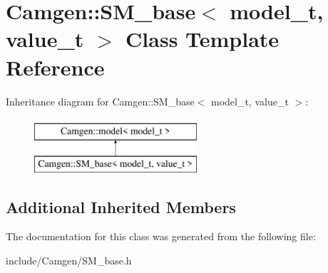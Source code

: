 \hypertarget{a00499}{\section{Camgen\-:\-:S\-M\-\_\-base$<$ model\-\_\-t, value\-\_\-t $>$ Class Template Reference}
\label{a00499}
}
Inheritance diagram for Camgen\-:\-:S\-M\-\_\-base$<$ model\-\_\-t, value\-\_\-t $>$\-:\begin{figure}[H]
\begin{center}
\leavevmode
\includegraphics[height=2.000000cm]{a00499}
\end{center}
\end{figure}
\subsection*{Additional Inherited Members}


The documentation for this class was generated from the following file\-:\begin{DoxyCompactItemize}
\item 
include/\-Camgen/S\-M\-\_\-base.\-h\end{DoxyCompactItemize}

